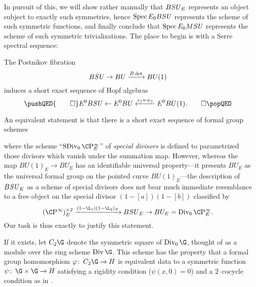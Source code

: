 \noindent In pursuit of this, we will show rather manually that $B\mathit{SU}_E$ represents an object subject to exactly such symmetries, hence $\operatorname{Spec} E_0 B\mathit{SU}$ represents the scheme of such symmetric functions, and finally conclude that $\operatorname{Spec} E_0 M\mathit{SU}$ represents the scheme of such symmetric trivializations.  The place to begin is with a Serre spectral sequence:
\begin{lemma}\label{BSUtoBUtoCPinftyIsSexseq}
The Postnikov fibration \[B\mathit{SU} \to BU \xrightarrow{B\det} BU(1)\] induces a short exact sequence of Hopf algebras
\[\pushQED{\qed}
E^0 B\SU \from E^0 BU \xleftarrow{c_1 \mapsfrom c_1} E^0 BU(1). \qedhere
\popQED\]
\end{lemma}

\noindent An equivalent statement is that there is a short exact sequence of formal group schemes
\begin{center}
\end{center}
where the scheme ``$\SDiv_0 \CP^\infty_E$'' of \textit{special divisors} is defined to parametrized those divisors which vanish under the summation map.  However, whereas the map $BU(1)_E \to BU_E$ has an identifiable universal property---it presents $BU_E$ as the universal formal group on the pointed curve $BU(1)_E$---the description of $B\mathit{SU}_E$ as a scheme of special divisors does not bear much immediate resemblance to a free object on the special divisor $(1 - [a])(1 - [b])$ classified by \[(\CP^\infty)^{\times 2}_E \xrightarrow{(1 - \L_1)(1 - \L_2)_E} B\SU_E \to BU_E = \Div_0 \CP^\infty_E.\]  Our task is thus exactly to justify this statement.

\begin{definition}\label{DefinitionOfC2G}
If it exists, let $C_2 \G$ denote the symmetric square of $\Div_0 \G$, thought of as a module over the ring scheme $\Div \G$.  This scheme has the property that a formal group homomorphism $\phi\co C_2 \G \to H$ is equivalent data to a symmetric function $\psi\co \G \times \G \to H$ satisfying a rigidity condition ($\psi(x, 0) = 0$) and a $2$--cocycle condition as in .
\end{definition}

